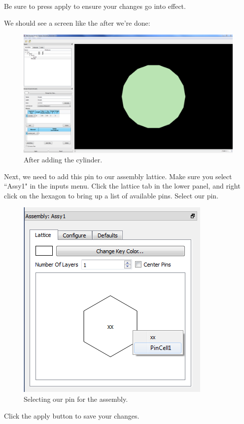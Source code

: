 Be sure to press apply to ensure your changes go into effect.

We should see a screen like the after we're done:

\begin{figure}[H]
	\begin{center}
		\includegraphics[width=0.85\linewidth]{Images/hex-14.png}
		\caption{After adding the cylinder.}
		\label{fig:Hex14}
	\end{center}
\end{figure}

Next, we need to add this pin to our assembly lattice.  Make sure you select ``Assy1" in the inputs menu.  Click the lattice tab in the lower panel, and right click on the hexagon to bring up a list of available pins.  Select our pin.

\begin{figure}[H]
	\begin{center}
		\includegraphics[width=0.5\linewidth]{Images/hex-18.png}
		\caption{Selecting our pin for the assembly.}
		\label{fig:Hex18}
	\end{center}
\end{figure}

Click the apply button to save your changes.

